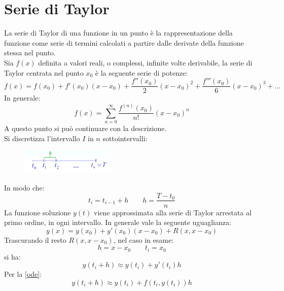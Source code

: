 \section{Serie di Taylor}
La serie di Taylor di una funzione in un punto è la rappresentazione della funzione come serie di termini calcolati a partire dalle derivate della funzione stessa nel punto.
\\Sia $f(x)$ definita a valori reali, o complessi, infinite volte derivabile, la serie di Taylor centrata nel punto $x_0$ è la seguente serie di potenze:
\begin{equation*}
	f(x) = f(x_{0}) + f'(x_{0})(x-x_{0}) + \dfrac{f''(x_{0})}{2}(x-x_{0})^{2}	+ \dfrac{f'''(x_{0})}{6}(x-x_{0})^{3} + ...
\end{equation*} 
In generale:
\begin{equation}
	f(x) = \sum_{n=0}^{\infty} \dfrac{f^{(n)}(x_{0})}{n!}(x-x_{0})^{n}
\end{equation}
A questo punto si può continuare con la descrizione.
\vspace{0.5cm}
\\Si discretizza l'intervallo $I$ in $n$ sottointervalli:
\begin{figure}[H]
	\centering
	\includegraphics[width=0.4\textwidth]{img/discretizzazione.png}
\end{figure}
In modo che:
\begin{equation*}
	t_{i} = t_{i-1}+h \qquad h = \dfrac{T-t_{0}}{n}
\end{equation*}
La funzione soluzione $y(t)$ viene approssimata alla serie di Taylor arrestata al primo ordine, in ogni intervallo. In generale vale la seguente uguaglianza:
\begin{equation*}
	y(x) = y(x_{0}) + y'(x_{0})(x-x_{0}) + R(x, x-x_{0})
\end{equation*}
Trascurando il resto $R(x, x-x_{0})$, nel caso in esame:
\begin{equation*}
	h = x-x_{0} \qquad t_{i}=x_{0}
\end{equation*}
si ha:
\begin{equation*}
	y(t_{i}+h) \approx y(t_{i}) + y'(t_{i})h
\end{equation*}
Per la \ref{ode}:
\begin{equation}
	y(t_{i}+h) \approx y(t_{i}) + f(t_{i}, y(t_{i}))h
\end{equation}
